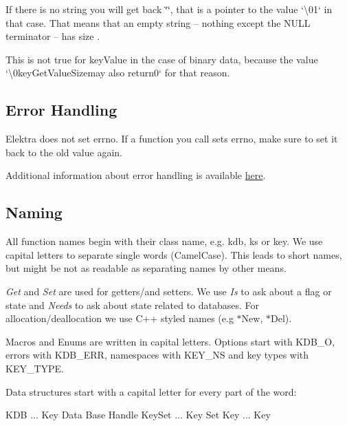 If there is no string you will get back {\ttfamily \char`\"{}\char`\"{}}, that is a pointer to the value `\textquotesingle{}\textbackslash{}01` in that case. That means that an empty string – nothing except the N\+U\+LL terminator – has size {}.

This is not true for {\ttfamily key\+Value} in the case of binary data, because the value `\textquotesingle{}\textbackslash{}0key\+Get\+Value\+Size{\ttfamily may also return}0` for that reason.

\subsection*{Error Handling}

Elektra does not set {\ttfamily errno}. If a function you call sets {\ttfamily errno}, make sure to set it back to the old value again.

Additional information about error handling is available \hyperlink{doc_dev_error-handling_md}{here}.

\subsection*{Naming}

All function names begin with their class name, e.\+g. {\ttfamily kdb}, {\ttfamily ks} or {\ttfamily key}. We use capital letters to separate single words (Camel\+Case). This leads to short names, but might be not as readable as separating names by other means.

{\itshape Get} and {\itshape Set} are used for getters/and setters. We use {\itshape Is} to ask about a flag or state and {\itshape Needs} to ask about state related to databases. For allocation/deallocation we use C++ styled names (e.\+g {\ttfamily $\ast$\+New}, {\ttfamily $\ast$\+Del}).

Macros and Enums are written in capital letters. Options start with {\ttfamily K\+D\+B\+\_\+O}, errors with {\ttfamily K\+D\+B\+\_\+\+E\+RR}, namespaces with {\ttfamily K\+E\+Y\+\_\+\+NS} and key types with {\ttfamily K\+E\+Y\+\_\+\+T\+Y\+PE}.

Data structures start with a capital letter for every part of the word\+: \begin{DoxyVerb}    KDB ... Key Data Base Handle
    KeySet ... Key Set
    Key ... Key
\end{DoxyVerb}



